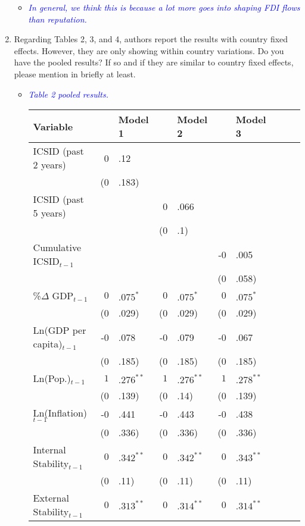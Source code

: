 \begin{enumerate}
\begin{itemize}
		\item \textcolor{blue}{ \emph{
		In general, we think this is because a lot more goes into shaping FDI flows than reputation. 
		}}
	\end{itemize}
	\item Regarding Tables 2, 3, and 4, authors report the results with country fixed effects. However, they are only showing within country variations. Do you have the pooled results? If so and if they are similar to country fixed effects, please mention in briefly at least.
	\begin{itemize}
		\item \textcolor{blue}{ \emph{ Table 2 pooled results. }}

			\begin{table}[ht]
			\centering
			\begingroup\footnotesize
			\begin{tabular}{lr@{} lr@{}lr@{}lr@{}lr@{}}
			Variable && Model 1 && Model 2 && Model 3 \\ 
			  \hline
			\hline
			ICSID  (past 2 years) & 0&.12 &&  &&  \\ 
			   & (0&.183) &&  &&  \\ 
			  ICSID  (past 5 years) &  && 0&.066 &&  \\ 
			   &  && (0&.1) &&  \\ 
			  Cumulative ICSID$_{t-1}$ &&  &&  & -0&.005 \\ 
			   &&  &&  & (0&.058) \\ 
			  \%$\Delta$ GDP$_{t-1}$ & $0$&$.075^{\ast}$ & $0$&$.075^{\ast}$ & $0$&$.075^{\ast}$ \\ 
			   & (0&.029) & (0&.029) & (0&.029) \\ 
			  Ln(GDP per capita)$_{t-1}$ & -0&.078 & -0&.079 & -0&.067 \\ 
			   & (0&.185) & (0&.185) & (0&.185) \\ 
			  Ln(Pop.)$_{t-1}$ & $1$&$.276^{\ast\ast}$ & $1$&$.276^{\ast\ast}$ & $1$&$.278^{\ast\ast}$ \\ 
			   & (0&.139) & (0&.14) & (0&.139) \\ 
			  Ln(Inflation)$_{t-1}$ & -0&.441 & -0&.443 & -0&.438 \\ 
			   & (0&.336) & (0&.336) & (0&.336) \\ 
			  Internal Stability$_{t-1}$ & $0$&$.342^{\ast\ast}$ & $0$&$.342^{\ast\ast}$ & $0$&$.343^{\ast\ast}$ \\ 
			   & (0&.11) & (0&.11) & (0&.11) \\ 
			  External Stability$_{t-1}$ & $0$&$.313^{\ast\ast}$ & $0$&$.314^{\ast\ast}$ & $0$&$.314^{\ast\ast}$ \\ 

\end{tabular}
\end{table}
\end{itemize}
\end{enumerate}
